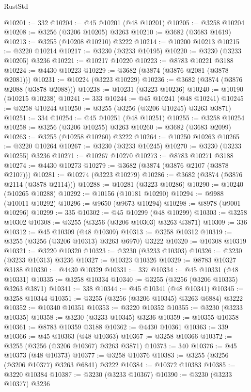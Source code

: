 \begin{lexlean}{RustStd}
\begin{coremodule}
{\begin{coremodule}
{{{{{{{{{{{{{{{{{{{{{{{{{{{{{{{{{{{{{@10201 := 332
@10204 := @45 @10201 (@48 @10201)
@10205 := @3258 @10204
@10208 := @3256 (@3206 @10205) @3263
@10210 := @3682 (@3683 @1619)
@10213 := @3255 (@10208 @10210) @3222
@10214 := @10200 @10213
@10215 := @3220 @10214
@10217 := @3230 (@3233 @10195)
@10220 := @3230 (@3233 @10205) @3236
@10221 := @10217 @10220
@10223 := @8783 @10221 @3188
@10224 := @4430 @10223
@10229 := @3682 (@3874 (@3876 @2081 (@3878 @2081)))
@10231 := @10224 (@3223 @10229)
@10236 := @3682 (@3874 (@3876 @2088 (@3878 @2088)))
@10238 := @10231 (@3223 @10236)
@10240 := @10190 (@10215 @10238)
@10241 := 333
@10244 := @45 @10241 (@48 @10241)
@10245 := @3258 @10244
@10250 := @3255 (@3256 (@3206 @10245) @3263 @3871)
@10251 := 334
@10254 := @45 @10251 (@48 @10251)
@10255 := @3258 @10254
@10258 := @3256 (@3206 @10255) @3263
@10260 := @3682 (@3683 @2099)
@10263 := @3255 (@10258 @10260) @3222
@10264 := @10250 @10263
@10265 := @3220 @10264
@10267 := @3230 (@3233 @10245)
@10270 := @3230 (@3233 @10255) @3236
@10271 := @10267 @10270
@10273 := @8783 @10271 @3188
@10274 := @4430 @10273
@10279 := @3682 (@3874 (@3876 @2107 (@3878 @2107)))
@10281 := @10274 (@3223 @10279)
@10286 := @3682 (@3874 (@3876 @2114 (@3878 @2114)))
@10288 := @10281 (@3223 @10286)
@10290 := @10240 (@10265 @10288)
@10292 := @10156 (@10181 @10290)
@10294 := @9988 (@10011 @10292)
@10296 := @9650 (@9673 @10294)
@10298 := @8978 (@9001 @10296)
@10299 := 335
@10302 := @45 @10299 (@48 @10299)
@10303 := @3258 @10302
@10308 := @3255 (@3256 (@3206 @10303) @3263 @3871)
@10309 := 336
@10312 := @45 @10309 (@48 @10309)
@10313 := @3258 @10312
@10319 := @3255 (@3256 (@3206 @10313) @3263 @6970) @3222
@10320 := @10308 @10319
@10321 := @3220 @10320
@10323 := @3230 (@3233 @10303)
@10326 := @3230 (@3233 @10313) @3236
@10327 := @10323 @10326
@10329 := @8783 @10327 @3188
@10330 := @4430 @10329
@10331 := 337
@10334 := @45 @10331 (@48 @10331)
@10335 := @3258 @10334
@10340 := @3255 (@3256 (@3206 @10335) @3263 @3871)
@10341 := 338
@10344 := @45 @10341 (@48 @10341)
@10345 := @3258 @10344
@10351 := @3255 (@3256 (@3206 @10345) @3263 @6884) @3222
@10352 := @10340 @10351
@10353 := @3220 @10352
@10355 := @3230 (@3233 @10335)
@10358 := @3230 (@3233 @10345) @3236
@10359 := @10355 @10358
@10361 := @8783 @10359 @3188
@10362 := @4430 @10361
@10363 := 339
@10366 := @45 @10363 (@48 @10363)
@10367 := @3258 @10366
@10372 := @3255 (@3256 (@3206 @10367) @3263 @3871)
@10373 := 340
@10376 := @45 @10373 (@48 @10373)
@10377 := @3258 @10376
@10383 := @3255 (@3256 (@3206 @10377) @3263 @6841) @3222
@10384 := @10372 @10383
@10385 := @3220 @10384
@10387 := @3230 (@3233 @10367)
@10390 := @3230 (@3233 @10377) @3236
}}}}}}}}}}}}}}}}}}}}}}}}}}}}}}}}}}}}}
\end{coremodule}}
\end{coremodule}
\end{lexlean}
